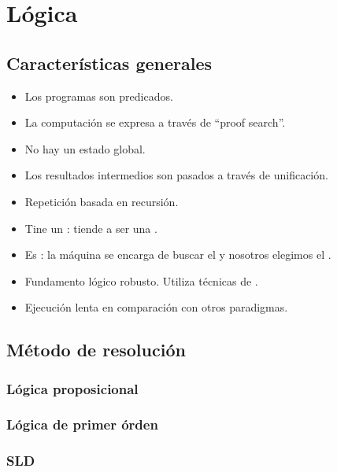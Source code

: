 \section{Lógica}

\subsection{Características generales}

\begin{itemize}
  \item Los programas son predicados.
  \item La computación se expresa a través de ``proof search''.
  \item No hay un estado global.
  \item Los resultados intermedios son pasados a través de unificación.
  \item Repetición basada en recursión.
  \item Tine un : tiende a ser una .
  \item Es : la máquina se encarga de buscar el  y nosotros elegimos el .
  \item Fundamento lógico robusto. Utiliza técnicas de .
  \item Ejecución lenta en comparación con otros paradigmas.
\end{itemize}


\subsection{Método de resolución}

\subsubsection{Lógica proposicional}
\subsubsection{Lógica de primer órden}
\subsubsection{SLD}
